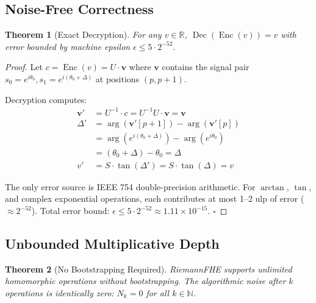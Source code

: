 \documentclass[11pt,a4paper]{article}
\newtheorem{theorem}{Theorem}[section]
\theoremstyle{remark}
\DeclareMathOperator{\Enc}{Enc}
\DeclareMathOperator{\Dec}{Dec}
\begin{document}
\subsection{Noise-Free Correctness}

\begin{theorem}[Exact Decryption]
For any $v \in \mathbb{R}$, $\Dec(\Enc(v)) = v$ with error bounded by machine epsilon $\epsilon \leq 5 \cdot 2^{-52}$.
\end{theorem}

\begin{proof}
Let $c = \Enc(v) = U \cdot \mathbf{v}$ where $\mathbf{v}$ contains the signal pair $s_0 = e^{i\theta_0}, s_1 = e^{i(\theta_0 + \Delta)}$ at positions $(p, p+1)$.

Decryption computes:
\begin{align}
    \mathbf{v}' &= U^{-1} \cdot c = U^{-1}U \cdot \mathbf{v} = \mathbf{v} \\
    \Delta' &= \arg(\mathbf{v}'[p+1]) - \arg(\mathbf{v}'[p]) \\
    &= \arg(e^{i(\theta_0 + \Delta)}) - \arg(e^{i\theta_0}) \\
    &= (\theta_0 + \Delta) - \theta_0 = \Delta \\
    v' &= S \cdot \tan(\Delta') = S \cdot \tan(\Delta) = v
\end{align}

The only error source is IEEE 754 double-precision arithmetic. For $\arctan$, $\tan$, and complex exponential operations, each contributes at most 1–2 ulp of error ($\approx 2^{-52}$). Total error bound: $\epsilon \leq 5 \cdot 2^{-52} \approx 1.11 \times 10^{-15}$. \hfill $\square$
\end{proof}

\subsection{Unbounded Multiplicative Depth}

\begin{theorem}[No Bootstrapping Required]
RiemannFHE supports unlimited homomorphic operations without bootstrapping. The algorithmic noise after $k$ operations is identically zero: $N_k = 0$ for all $k \in \mathbb{N}$.
\end{theorem}
\end{document}

